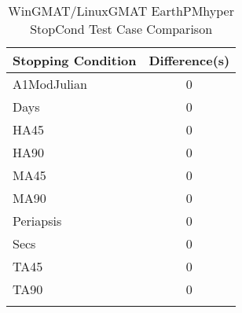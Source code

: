 \begin{table}[htbp!]
\centering
\caption{ WinGMAT/LinuxGMAT EarthPMhyper StopCond Test Case Comparison}
      \begin{tabular}{lc}
      \hline\hline
          Stopping Condition & Difference(s) \\
         \hline
         A1ModJulian & 0 \\
         Days & 0 \\
         HA45 & 0 \\
         HA90 & 0 \\
         MA45 & 0 \\
         MA90 & 0 \\
         Periapsis & 0 \\
         Secs & 0 \\
         TA45 & 0 \\
         TA90 & 0 \\
      \hline\hline
      \label{Table: WinGMAT-LinuxGMAT EarthPMhyper StopCond Table} 
\end{tabular}
\end{table}
